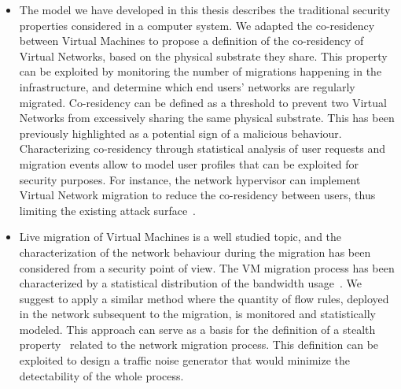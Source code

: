 \begin{itemize}
    \item 
    The model we have developed in this thesis describes the traditional security properties considered in a computer system. We adapted the co-residency between Virtual Machines to propose a definition of the co-residency of Virtual Networks, based on the physical substrate they share. This property can be exploited by monitoring the number of migrations happening in the infrastructure, and determine which end users' networks are regularly migrated. Co-residency can be defined as a threshold to prevent two Virtual Networks from excessively sharing the same physical substrate. This has been previously highlighted as a potential sign of a malicious behaviour. Characterizing co-residency through statistical analysis of user requests and migration events allow to model user profiles that can be exploited for security purposes. For instance, the network hypervisor can implement Virtual Network migration to reduce the co-residency between users, thus limiting the existing attack surface~\cite{nomad-Moon2015b,malicious-atya2017}.

    \item 
    Live migration of Virtual Machines is a well studied topic, and the characterization of the network behaviour during the migration has been considered from a security point of view.
    The VM migration process has been characterized by a statistical distribution of the bandwidth usage~\cite{stealth-Achleitner2017a}.
    We suggest to apply a similar method where the quantity of flow rules, deployed in the network subsequent to the migration, is monitored and statistically modeled. This approach can serve as a basis for the definition of a stealth property~\cite{stealth-Achleitner2017a} related to the network migration process. This definition can be exploited to design a traffic noise generator that would minimize the detectability of the whole process.



\end{itemize}
